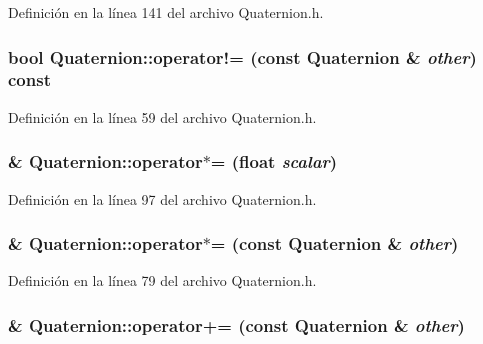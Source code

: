 Definición en la línea 141 del archivo Quaternion.h.

\hypertarget{struct_quaternion_aa2b9f08ded11182532dd99af87189a5c}{
\subsubsection[{operator!=}]{\setlength{\rightskip}{0pt plus 5cm}bool Quaternion::operator!= (const {\bf Quaternion} \& {\em other}) const}}
\label{struct_quaternion_aa2b9f08ded11182532dd99af87189a5c}


Definición en la línea 59 del archivo Quaternion.h.

\hypertarget{struct_quaternion_a5c8d605f81f7f3ede3d6c53480752359}{
\subsubsection[{operator$\ast$=}]{ \& Quaternion::operator$\ast$= (float {\em scalar})}}
\label{struct_quaternion_a5c8d605f81f7f3ede3d6c53480752359}


Definición en la línea 97 del archivo Quaternion.h.

\hypertarget{struct_quaternion_a005233b2ecdca221e818975ef5f68d0e}{
\subsubsection[{operator$\ast$=}]{ \& Quaternion::operator$\ast$= (const {\bf Quaternion} \& {\em other})}}
\label{struct_quaternion_a005233b2ecdca221e818975ef5f68d0e}


Definición en la línea 79 del archivo Quaternion.h.

\hypertarget{struct_quaternion_a72ef12aabea6b197ca0c386f8692131c}{
\subsubsection[{operator+=}]{ \& Quaternion::operator+= (const {\bf Quaternion} \& {\em other})}}
\label{struct_quaternion_a72ef12aabea6b197ca0c386f8692131c}


